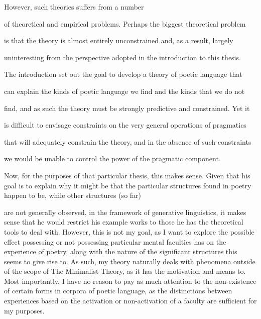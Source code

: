 \documentclass[]{article}
\begin{document}
However, such theories suffers from a number

of theoretical and empirical problems. Perhaps the biggest theoretical problem

is that the theory is almost entirely unconstrained and, as a result, largely

uninteresting from the perspective adopted in the introduction to this thesis.

The introduction set out the goal to develop a theory of poetic language that

can explain the kinds of poetic language we find and the kinds that we do not

find, and as such the theory must be strongly predictive and constrained. Yet it

is difficult to envisage constraints on the very general operations of pragmatics

that will adequately constrain the theory, and in the absence of such constraints

we would be unable to control the power of the pragmatic component.


Now, for the purposes of that particular thesis, this makes sense. Given that his goal is to explain why it might be that the particular structures found in poetry happen to be, while other structures (so far)

are not generally observed, in the framework of generative linguistics, it makes sense that he would restrict his example works to those he has the theoretical tools to deal with. However, this is not my goal, as I want to explore the possible effect possessing or not possessing particular mental faculties has on the experience of poetry, along with the nature of the significant structures this seems to give rise to. As such, my theory naturally deals with phenomena outside of the scope of The Minimalist Theory, as it has the motivation and means to. Most importantly, I have no reason to pay as much attention to the non-existence of certain forms in corpora of poetic language, as the distinctions between experiences based on the activation or non-activation of a faculty are sufficient for my purposes.
\end{document}
